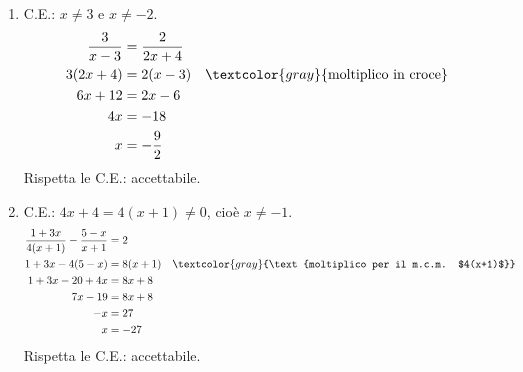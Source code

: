 \begin{question}[ID=3.1, subtitle={Equazioni frazionarie}, difficulty=facile, tags={equazioni frazionarie}]
\begin{explanation}
\begin{enumerate}
\[\begin{aligned}
    2x-1 &= 6x-2\\
    -4x &= -1\\
    x &= \dfrac14
    \end{aligned}\]
    $\tfrac14\neq\tfrac13$: accettabile.
    \item C.E.: $x\neq3$ e $x\neq-2$.
    \[\begin{aligned}
    \dfrac{3}{x-3} &= \dfrac{2}{2x+4}\\
    3(2x+4) &= 2(x-3) && \textcolor{gray}{\text{moltiplico in croce}}\\
    6x+12 &= 2x-6\\
    4x &= -18\\
    x &= -\dfrac92
    \end{aligned}\]
    Rispetta le C.E.: accettabile.
    \item C.E.: $4x+4=4(x+1)\neq0$, cioè $x\neq-1$.
    \[\begin{aligned}
    \dfrac{1+3x}{4(x+1)}-\dfrac{5-x}{x+1} &= 2\\
    1+3x-4(5-x) &= 8(x+1) && \textcolor{gray}{\text{moltiplico per il m.c.m. $4(x+1)$}}\\
    1+3x-20+4x &= 8x+8\\
    7x-19 &= 8x+8\\
    -x &= 27\\
    x &= -27
    \end{aligned}\]
    Rispetta le C.E.: accettabile.
\end{enumerate}
\end{explanation}
\end{question}


